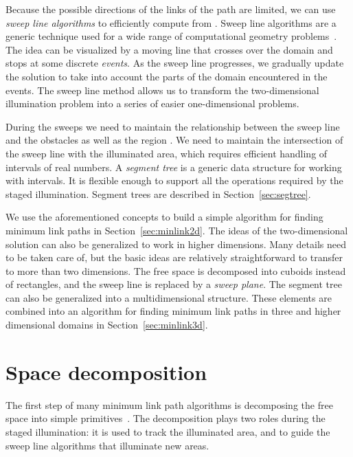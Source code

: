 \documentclass[english,gradu]{tktltiki2018}
\begin{document}
Because the possible directions of the links of the path are limited, we can use \emph{sweep line algorithms} to efficiently compute  from .
Sweep line algorithms are a generic technique used for a wide range of computational geometry problems~\cite[Section~33.2]{clrs}.
The idea can be visualized by a moving line that crosses over the domain and stops at some discrete \emph{events}.
As the sweep line progresses, we gradually update the solution to take into account the parts of the domain encountered in the events.
The sweep line method allows us to transform the two-dimensional illumination problem into a series of easier one-dimensional problems.

During the sweeps we need to maintain the relationship between the sweep line and the obstacles as well as the region .
We need to maintain the intersection of the sweep line with the illuminated area, which requires efficient handling of intervals of real numbers.
A \emph{segment tree} is a generic data structure for working with intervals.
It is flexible enough to support all the operations required by the staged illumination.
Segment trees are described in Section~\ref{sec:segtree}.

We use the aforementioned concepts to build a simple algorithm for finding minimum link paths in Section~\ref{sec:minlink2d}.
The ideas of the two-dimensional solution can also be generalized to work in higher dimensions.
Many details need to be taken care of, but the basic ideas are relatively straightforward to transfer to more than two dimensions.
The free space is decomposed into cuboids instead of rectangles, and the sweep line is replaced by a \emph{sweep plane}.
The segment tree can also be generalized into a multidimensional structure.
These elements are combined into an algorithm for finding minimum link paths in three and higher dimensional domains in Section~\ref{sec:minlink3d}.



\section{Space decomposition}\label{sec:decomposition}

The first step of many minimum link path algorithms is decomposing the free space into simple primitives~\cite{dasnar,imai86,revisited}.
The decomposition plays two roles during the staged illumination:
it is used to track the illuminated area, and to guide the sweep line algorithms that illuminate new areas.
\end{document}
